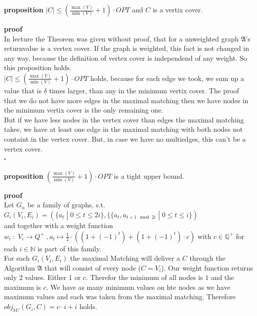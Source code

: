 \documentclass[11pt,a4paper,ngerman]{article}
\begin{document}
\begin{description}
\item{\bfseries proposition} $|C| \leq \left( \frac{\max (V)}{\min (V)} + 1 \right) \cdot OPT$ and $C$ is a vertix cover. 
\item{\bfseries proof}\\
In lecture the Theorem was given without proof, that for a unweighted graph $\mathfrak{A}$'s returnvalue is a vertex cover. If the graph is weighted, this fact is not changed in any way, because the definition of vertex cover is independend of any weight. So this proposition holds.\\

$|C| \leq \left( \frac{\max (V)}{\min (V)} + 1 \right) \cdot OPT$ holds, because for each edge we took, we sum up a value that is $\delta$ times larger, than any in the minimum vertix cover. The proof that we do not have more edges in the maximal matching then we have nodes in the minimum vertix cover is the only remaining one.\\
But if we have less nodes in the vertex cover than edges the maximal matching takes, we have at least one edge in the maximal matching with both nodes not containt in the vertex cover. But, in case we have no multiedges, this can't be a vertex cover.\\
\mbox{}\hfill $\square$

\item{\bfseries proposition} $ \left( \frac{\max (V)}{\min (V)} + 1 \right) \cdot OPT$ is a tight upper bound.
\item{\bfseries proof} \\Let $G_n$ be a family of graphs, s.t. \\$G_i(V_i,E_i) = (\{a_t \; | \; 0 \leq t \leq 2i \}, \{ \{a_t, a_{t+1 \mod 2i} \; | \; 0 \leq t \leq i \})$ \\and together with a weight function \\$w_i \; : \; V_i \rightarrow Q^+ \; , a_t \mapsto \frac{1}{2} \cdot \left( (1+(-1)^t) + (1+(-1)^t) \cdot c \right)$ with $c \in \mathbb{Q}^+$ for each $i \in \mathbb{N}$ is part of this family.\\

For each $G_i(V_i,E_i)$ the maximal Matching will deliver a $C$ through the Algorithm $\mathfrak{A}$ that will consist of every node ($C=V_i$). Our weight function returns only 2 values. Either $1$ or $c$. Therefor the minimum of all nodes is $1$ and the maximum is $c$. We have as many minimum values on hte nodes as we have maximum values and each was taken from the maximal matching. Therefore $obj_{VC} (G_i, C) = c\cdot i + i$ holds.\\


\end{description}
\end{document}
